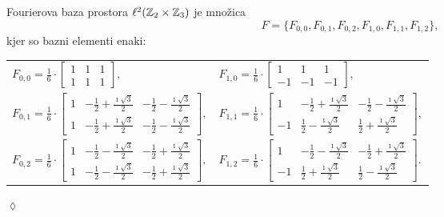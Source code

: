 \begin{primer}
Fourierova baza prostora $\ell^2(\mathbb Z_2 \times \mathbb Z_3)$ je množica
$$F = \{F_{0,0}, F_{0,1}, F_{0,2}, F_{1,0}, F_{1,1}, F_{1,2}\},$$
kjer so bazni elementi enaki:\\[0.2cm]
%
\begin{tabular}{ll}
  $
  F_{0,0} = \frac{1}{6}\cdot
    \begin{bmatrix}
      1 & 1 & 1\\
      1 & 1 & 1
    \end{bmatrix},
  $ &
  $
  F_{1,0} = \frac{1}{6}\cdot
    \begin{bmatrix}
      1 & 1 & 1\\
      -1 & -1 & -1
    \end{bmatrix},
  $ \\[0.3cm]
  $
  F_{0,1} = \frac{1}{6}\cdot
    \begin{bmatrix}
      1 & -\frac{1}{2}+\frac{\imath \sqrt{3}}{2} & -\frac{1}{2}-\frac{\imath \sqrt{3}}{2} \\[0.1cm]
      1 & -\frac{1}{2}+\frac{\imath \sqrt{3}}{2} & -\frac{1}{2}-\frac{\imath \sqrt{3}}{2}
    \end{bmatrix},
  $ &
  $
  F_{1,1} = \frac{1}{6}\cdot
    \begin{bmatrix}
      1 & -\frac{1}{2}+\frac{\imath \sqrt{3}}{2} & -\frac{1}{2}-\frac{\imath \sqrt{3}}{2} \\[0.1cm]
      -1 & \frac{1}{2}-\frac{\imath \sqrt{3}}{2} & \frac{1}{2}+\frac{\imath \sqrt{3}}{2}
    \end{bmatrix},
  $ \\[0.3cm]
  $
  F_{0,2} = \frac{1}{6}\cdot
    \begin{bmatrix}
      1 & -\frac{1}{2}-\frac{\imath \sqrt{3}}{2} & -\frac{1}{2}+\frac{\imath \sqrt{3}}{2} \\[0.1cm]
      1 & -\frac{1}{2}-\frac{\imath \sqrt{3}}{2} & -\frac{1}{2}+\frac{\imath \sqrt{3}}{2}
    \end{bmatrix},
  $ &
  $
  F_{1,2} = \frac{1}{6}\cdot
    \begin{bmatrix}
      1 & -\frac{1}{2}-\frac{\imath \sqrt{3}}{2} & -\frac{1}{2}+\frac{\imath \sqrt{3}}{2} \\[0.1cm]
      -1 & \frac{1}{2}+\frac{\imath \sqrt{3}}{2} & \frac{1}{2}-\frac{\imath \sqrt{3}}{2}
    \end{bmatrix}.
  $
\end{tabular}

  \hfill $\lozenge$
%
\end{primer}
%
